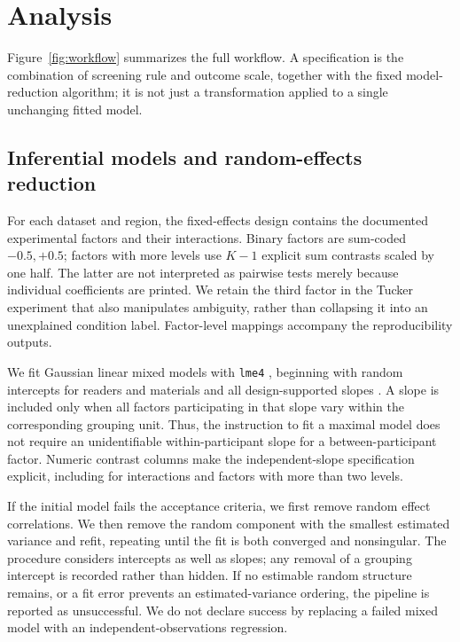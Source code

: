 \section{Analysis}


Figure~\ref{fig:workflow} summarizes the full workflow. A specification is
the combination of screening rule and outcome scale, together with the
fixed model-reduction algorithm; it is not just a transformation applied
to a single unchanging fitted model.

\subsection{Inferential models and random-effects reduction}

For each dataset and region, the fixed-effects design contains the
documented experimental factors and their interactions. Binary factors are
sum-coded \(-0.5,+0.5\); factors with more levels use \(K-1\) explicit
sum contrasts scaled by one half. The latter are not interpreted as
pairwise tests merely because individual coefficients are printed. We
retain the third factor in the Tucker experiment that also manipulates
ambiguity, rather than collapsing it into an unexplained condition label.
Factor-level mappings accompany the reproducibility outputs.

We fit Gaussian linear mixed models with \texttt{lme4}
\citep{bates_fitting_2015}, beginning with random intercepts for readers
and materials and all design-supported slopes
\citep{barr_random_2013}. A slope is included only when all factors
participating in that slope vary within the corresponding grouping unit.
Thus, the instruction to fit a maximal model does not require an
unidentifiable within-participant slope for a between-participant factor.
Numeric contrast columns make the independent-slope specification explicit,
including for interactions and factors with more than two levels.

If the initial model fails the acceptance criteria, we first remove random
effect correlations. We then remove the random component with the smallest
estimated variance and refit, repeating until the fit is both converged
and nonsingular. The procedure considers intercepts as well as slopes;
any removal of a grouping intercept is recorded rather than hidden.
If no estimable random structure remains, or a fit error prevents an
estimated-variance ordering, the pipeline is reported as unsuccessful.
We do not declare success by replacing a failed mixed model with an
independent-observations regression.

